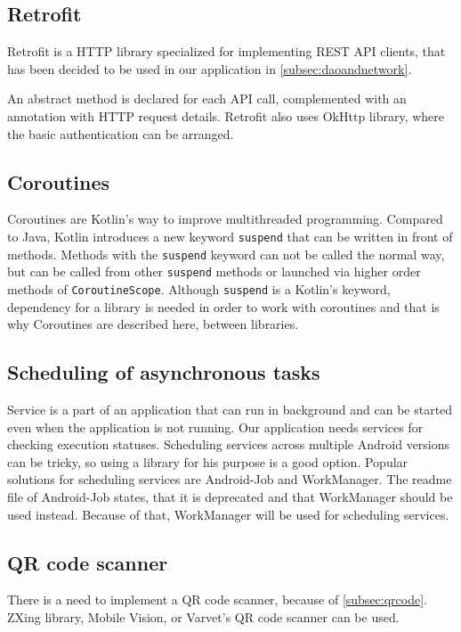 \subsection{Retrofit}
Retrofit is a HTTP library specialized for implementing REST API clients, that has been decided to be used in our application in \autoref{subsec:daoandnetwork}.

An abstract method is declared for each API call, complemented with an annotation with HTTP request details.
Retrofit also uses OkHttp\cite{okhttp} library, where the basic authentication can be arranged.

\subsection{Coroutines}
Coroutines are Kotlin's way to improve multithreaded programming.
Compared to Java, Kotlin introduces a new keyword \verb|suspend| that can be written in front of methods.
Methods with the \verb|suspend| keyword can not be called the normal way, but can be called from other \verb|suspend| methods or launched via higher order methods of \verb|CoroutineScope|.
Although \verb|suspend| is a Kotlin's keyword, dependency for a library is needed in order to work with coroutines and that is why Coroutines are described here, between libraries.

\subsection{Scheduling of asynchronous tasks}
Service is a part of an application that can run in background and can be started even when the application is not running.
Our application needs services for checking execution statuses.
Scheduling services across multiple Android versions can be tricky, so using a library for his purpose is a good option.
Popular solutions for scheduling services are Android-Job\cite{androidjob} and WorkManager\cite{workmanager}.
The readme file of Android-Job states, that it is deprecated and that WorkManager should be used instead.\cite{androidjob}
Because of that, WorkManager will be used for scheduling services.

\subsection{QR code scanner}
There is a need to implement a QR code scanner, because of \autoref{subsec:qrcode}.
ZXing library\cite{zxing}, Mobile Vision\cite{vision}, or Varvet's QR code scanner\cite{varvet} can be used.

